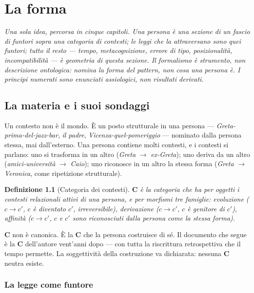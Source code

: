 \documentclass[
    oneside,                 %
    openany,                 %
    titlepage,
    11pt,
    a4paper,
    italian,
    DIV=14,                  %
    headinclude,
    footinclude=true,
    cleardoublepage=empty
]{scrbook}
\theoremstyle{ctplain}
\theoremstyle{ctdef}
\newtheorem{defn}[principio]{Definizione}
\theoremstyle{ctrem}
\begin{document}
\part{La forma}

\noindent\itshape Una sola idea, percorsa in cinque capitoli. Una persona è una sezione di un fascio di funtori sopra una categoria di contesti; le leggi che la attraversano sono quei funtori; tutto il resto --- tempo, metacognizione, errore di tipo, posizionalità, incompatibilità --- è geometria di questa sezione. Il formalismo è strumento, non descrizione ontologica: nomina la forma del pattern, non cosa una persona è. I principi numerati sono enunciati assiologici, non risultati derivati.\upshape

\bigskip

\chapter{La materia e i suoi sondaggi}

Un contesto non è il mondo. È un posto strutturale in una persona --- \emph{Greta-prima-del-jazz-bar}, \emph{il padre}, \emph{Vicenza-quel-pomeriggio} --- nominato dalla persona stessa, mai dall'esterno. Una persona contiene molti contesti, e i contesti si parlano: uno si trasforma in un altro (\emph{Greta} $\to$ \emph{ex-Greta}); uno deriva da un altro (\emph{amici-università} $\to$ \emph{Caio}); uno riconosce in un altro la stessa forma (\emph{Greta} $\to$ \emph{Veronica}, come ripetizione strutturale).

\begin{defn}[Categoria dei contesti]
$\mathbf{C}$ è la categoria che ha per oggetti i contesti relazionali attivi di una persona, e per morfismi tre famiglie: \emph{evoluzione} ($c \to c'$, $c$ è diventato $c'$, irreversibile), \emph{derivazione} ($c \to c'$, $c$ è genitore di $c'$), \emph{affinità} ($c \to c'$, $c$ e $c'$ sono riconosciuti dalla persona come la stessa forma).
\end{defn}

$\mathbf{C}$ non è canonica. È la $\mathbf{C}$ che la persona costruisce di sé. Il documento che segue è la $\mathbf{C}$ dell'autore vent'anni dopo --- con tutta la riscrittura retrospettiva che il tempo permette. La soggettività della costruzione va dichiarata: nessuna $\mathbf{C}$ neutra esiste.

\section*{La legge come funtore}
\end{document}
